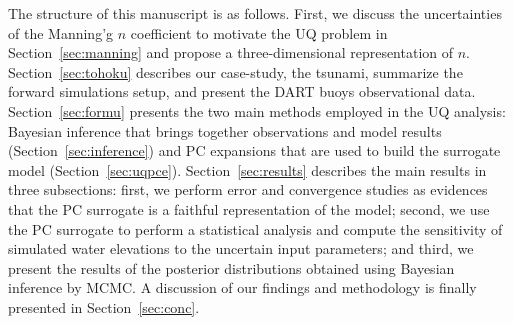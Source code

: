 The structure of this manuscript is as follows. First, we discuss the uncertainties 
of the Manning'g $n$ coefficient to motivate the UQ problem in Section~\ref{sec:manning}
and propose a \alert{three}-dimensional representation of $n$. 
Section~\ref{sec:tohoku} describes our case-study, the \tohoku tsunami,
summarize the forward simulations setup, and present the DART buoys observational data. 
Section~\ref{sec:formu} presents the two main methods employed in the UQ analysis:
Bayesian inference that brings together observations 
and model results (Section~\ref{sec:inference}) 
and PC expansions that are used to build the surrogate model (Section~\ref{sec:uqpce}). Section~\ref{sec:results} describes the main results in 
three subsections: first, we perform error and convergence studies
as evidences that the PC surrogate is a faithful 
representation of the \geoclaw model; second, we use the PC surrogate to 
perform a statistical analysis and compute the  sensitivity of simulated water elevations
to the uncertain input parameters; and third, we present the results of the
posterior distributions obtained using Bayesian inference by MCMC. A discussion of our findings and methodology is finally presented in Section~\ref{sec:conc}.

